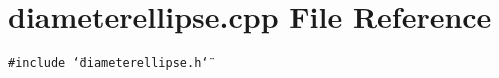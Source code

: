 \section{diameterellipse.cpp File Reference}
\label{diameterellipse_8cpp}
{\tt \#include \char`\"{}diameterellipse.h\char`\"{}}\par
